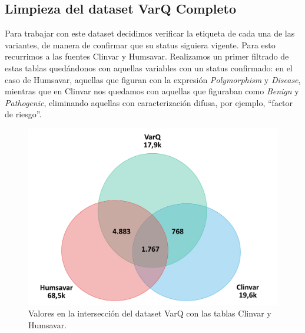 \subsection{Limpieza del dataset VarQ Completo}

Para trabajar con este dataset decidimos verificar la etiqueta de cada una de las variantes, de manera de confirmar que su status siguiera vigente. Para esto recurrimos a las fuentes Clinvar y Humsavar. Realizamos un primer filtrado de estas tablas quedándonos con aquellas variables con un status confirmado: en el caso de Humsavar, aquellas que figuran con la expresión \textit{Polymorphism} y \textit{Disease}, mientras que en Clinvar nos quedamos con aquellas que figuraban como \textit{Benign} y \textit{Pathogenic}, eliminando aquellas con caracterización difusa, por ejemplo, ``factor de riesgo''. 

\begin{figure}[H]
    \centering
    \includegraphics[scale=0.4]{documents/latex/figures/3/varq/interseccion_varq.pdf}
    \caption{Valores en la intersección del dataset VarQ con las tablas Clinvar y Humsavar.}
    \label{fig:interseccion_varq}
\end{figure}

